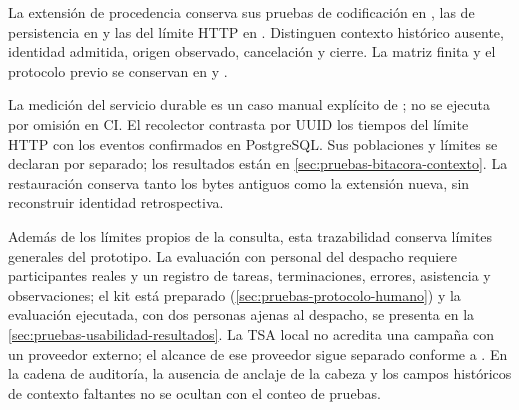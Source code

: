 La extensión de procedencia conserva sus pruebas de codificación en
, las de persistencia en
 y las del
límite HTTP en . Distinguen contexto
histórico ausente, identidad admitida, origen observado, cancelación y cierre.
La matriz finita y el protocolo previo se conservan en
 y
.

La medición del servicio durable es un caso manual explícito de
; no se ejecuta
por omisión en CI. El recolector
 contrasta por UUID los tiempos del
límite HTTP con los eventos confirmados en PostgreSQL. Sus poblaciones y límites
se declaran por separado; los resultados están en
\cref{sec:pruebas-bitacora-contexto}. La restauración conserva tanto los bytes
antiguos como la extensión nueva, sin reconstruir identidad retrospectiva.

Además de los límites propios de la consulta, esta trazabilidad conserva límites
generales del prototipo. La evaluación con personal del despacho requiere
participantes reales y un registro de tareas, terminaciones, errores, asistencia
y observaciones; el kit está preparado (\cref{sec:pruebas-protocolo-humano}) y
la evaluación ejecutada, con dos personas ajenas al despacho, se presenta en la
\cref{sec:pruebas-usabilidad-resultados}. La TSA local no
acredita una campaña con un proveedor externo; el alcance de ese proveedor sigue
separado conforme a . En la
cadena de auditoría, la ausencia de anclaje de la cabeza y los campos históricos
de contexto faltantes no se ocultan con el conteo de pruebas.
